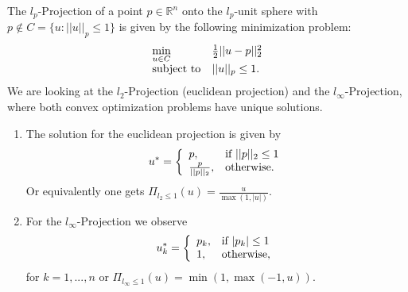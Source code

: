     \begin{example}
    \label{ex:projection_operator}

        The $l_{p}$-Projection of a point $p \in \mathbb{R}^{n}$ onto the $l_{p}$-unit sphere with $p \notin C = \{u : ||u||_{p} \le 1 \}$ is given by the following minimization problem:
            \begin{equation}
                \begin{array}{l l}
                    \min\limits_{u \in C} &  \frac{1}{2} ||u - p||_{2}^{2} \\
                    \textnormal{subject to} & ||u||_{p} \le 1.
                \end{array}
                \notag
            \end{equation}
        We are looking at the $l_{2}$-Projection (euclidean projection) and the $l_{\infty}$-Projection, where both convex optimization problems have unique solutions.%
        \begin{enumerate}
            \item The solution for the euclidean projection is given by
                \begin{equation}
                    u^{\ast} =
                    \left\{
                        \begin{array}{l l}
                           p, & \textnormal{if}\,\, ||p||_{2} \le 1 \\
                           \frac{p}{||p||_{2}}, & \textnormal{otherwise.}
                        \end{array}
                    \right.
                    \notag
                \end{equation}
            Or equivalently one gets $\Pi_{l_{2} \le 1}(u) = \frac{u}{\max(1, |u|)}$.
            \item For the $l_{\infty}$-Projection we observe
                \begin{equation}
                    u_{k}^{\ast} =
                    \left\{
                        \begin{array}{l l}
                           p_{k}, & \textnormal{if}\,\, |p_{k}| \le 1 \\
                           1, & \textnormal{otherwise,}
                        \end{array}
                    \right.
                    \notag
                \end{equation}
            for $k = 1, ..., n$ or $\Pi_{l_{\infty} \le 1}(u) = \min(1, \max(-1, u))$.
        \end{enumerate}

    \end{example}

